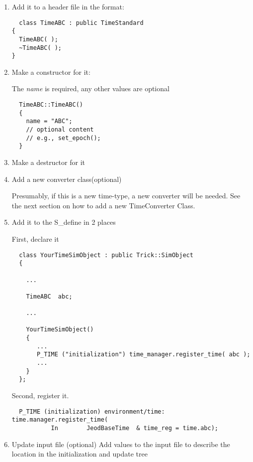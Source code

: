 \begin{enumerate}


\item{Add it to a header file in the format:}

\begin{verbatim}
  class TimeABC : public TimeStandard
{
  TimeABC( );
  ~TimeABC( );
}
\end{verbatim}


\item{Make a constructor for it:}

The \textit{name} is required, any other values are optional

\begin{verbatim}
  TimeABC::TimeABC()
  {
    name = "ABC";
    // optional content
    // e.g., set_epoch();
  }
\end{verbatim}

\item{Make a destructor for it}
\item{Add a new converter class(optional)}

Presumably, if this is a new time-type, a new converter will be needed.
See the next section on how to add a new TimeConverter Class.

\item{Add it to the S\_define in 2 places}

First, declare it
\begin{verbatim}
  class YourTimeSimObject : public Trick::SimObject
  {

    ...

    TimeABC  abc;

    ...

    YourTimeSimObject()
    {
       ...
       P_TIME ("initialization") time_manager.register_time( abc );
       ...
    }
  };
\end{verbatim}

Second, register it.

\begin{verbatim}
  P_TIME (initialization) environment/time:     time.manager.register_time(
           In        JeodBaseTime  & time_reg = time.abc);
\end{verbatim}

\item{Update input file (optional)}
Add values to the input file to describe the location in the
initialization and update tree

\end{enumerate}



